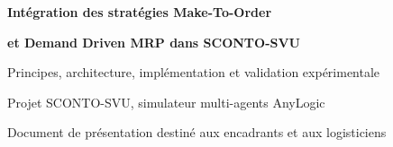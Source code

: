 \documentclass[11pt,a4paper,oneside]{report}
\begin{document}
\begin{titlepage}
  \centering
  \vspace*{2.2cm}
  {\ArialBlackFont\bfseries\fontsize{20}{24}\selectfont Intégration des stratégies Make-To-Order\par}
  \vspace{0.3cm}
  {\ArialBlackFont\bfseries\fontsize{20}{24}\selectfont et Demand Driven MRP dans SCONTO-SVU\par}
  \vspace{0.9cm}
  {\ArialFont\fontsize{14}{17}\selectfont Principes, architecture, implémentation et validation expérimentale\par}
  \vspace{1.2cm}
  {\Large Projet SCONTO-SVU, simulateur multi-agents AnyLogic\par}
  \vfill
  {\large Document de présentation destiné aux encadrants et aux logisticiens\par}
  \vspace{0.4cm}
\end{titlepage}

\tableofcontents
\listoffigures
\listoftables
\clearpage











\end{document}
